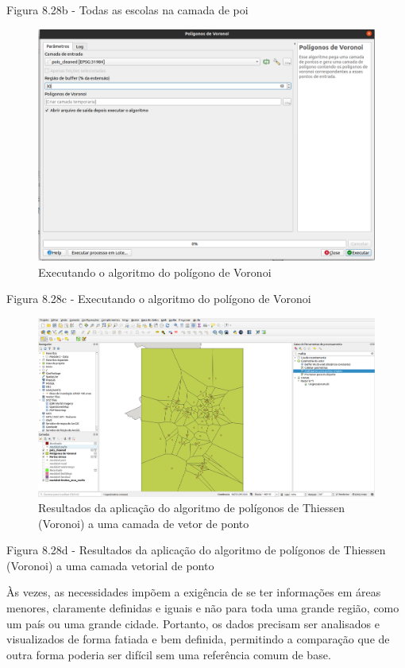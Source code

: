 \documentclass[
]{book}
\begin{document}
Figura 8.28b - Todas as escolas na camada de poi

\begin{figure}
\centering
\includegraphics{media/modulo8/fig828_c.png}
\caption{Executando o algoritmo do polígono de Voronoi}
\end{figure}

Figura 8.28c - Executando o algoritmo do polígono de Voronoi

\begin{figure}
\centering
\includegraphics{media/modulo8/fig828_d.png}
\caption{Resultados da aplicação do algoritmo de polígonos de Thiessen (Voronoi) a uma camada de vetor de ponto}
\end{figure}

Figura 8.28d - Resultados da aplicação do algoritmo de polígonos de Thiessen (Voronoi) a uma camada vetorial de ponto

Às vezes, as necessidades impõem a exigência de se ter informações em áreas menores, claramente definidas e iguais e não para toda uma grande região, como um país ou uma grande cidade. Portanto, os dados precisam ser analisados \hspace{0pt}\hspace{0pt}e visualizados de forma fatiada e bem definida, permitindo a comparação que de outra forma poderia ser difícil sem uma referência comum de base.
\end{document}
